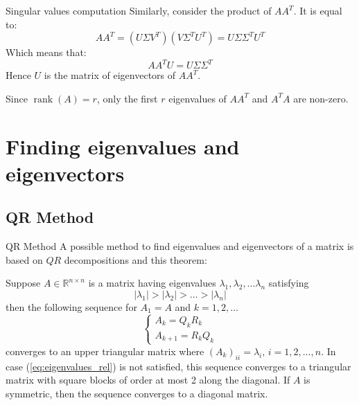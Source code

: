 \documentclass[10pt]{beamer}
\DeclareMathOperator{\rank}{rank}
\begin{document}
\begin{frame}{Singular values computation}
    Similarly, consider the product of $A A^T$. It is equal to:
    $$ A A^T = (U \Sigma V^T)( V \Sigma^T U^T ) = U \Sigma \Sigma^T U^T$$
    Which means that:
    $$ AA^T U = U \Sigma \Sigma^T $$
    Hence $U$ is the matrix of eigenvectors of $AA^T$. \bigskip

    Since $\rank(A) = r$, only the first $r$ eigenvalues of $AA^T$ and $A^T A$ are non-zero.
\end{frame}

\section{Finding eigenvalues and eigenvectors}
\subsection{QR Method}

\begin{frame}{QR Method}
    A possible method to find eigenvalues and eigenvectors of a matrix is based on $QR$ decompositions and this theorem:
    \begin{theorem}
        Suppose $A \in \mathbb{R}^{n \times n}$ is a matrix having eigenvalues $\lambda_1, \lambda_2, \ldots \lambda_n$ satisfying 
        \begin{equation}
            \label{eq:eigenvalues_rel}
            \left\lvert \lambda_1 \right\rvert > \left\lvert \lambda_2 \right\rvert > \ldots > \left\lvert \lambda_n \right\rvert
        \end{equation}
        then the following sequence for $A_1 = A$ and $k = 1, 2, \ldots$
        \begin{equation}
            \label{eq:A_sequence}
            \begin{cases}
                A_k = Q_k R_k \\
                A_{k+1} = R_k Q_k 
            \end{cases} 
        \end{equation}
        converges to an upper triangular matrix where $(A_k)_{ii} = \lambda_i, \, i = 1, 2, \ldots, n$.
        In case (\ref{eq:eigenvalues_rel}) is not satisfied, this sequence converges to a triangular matrix with square blocks of order at most 2 along the diagonal. \newline
        If $A$ is symmetric, then the sequence converges to a diagonal matrix. 
    \end{theorem}
\end{frame}
\end{document}
